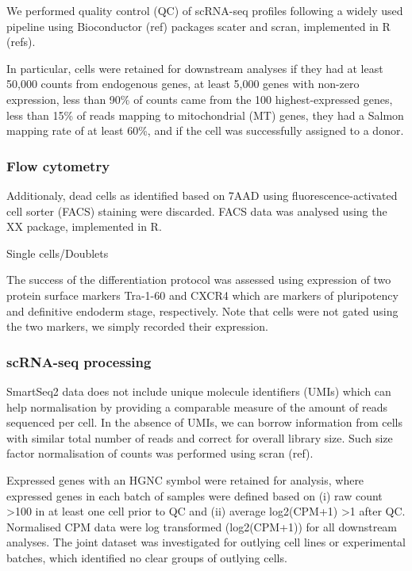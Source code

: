 We performed quality control (QC) of scRNA-seq profiles following a widely used pipeline using Bioconductor (ref) packages scater \cite{mccarthy2017scater} and scran, implemented in R (refs).  

In particular, cells were retained for downstream analyses if they had at least 50,000 counts from endogenous genes, at least 5,000 genes with non-zero expression, less than 90\% of counts came from the 100 highest-expressed genes, less than 15\% of reads mapping to mitochondrial (MT) genes, they had a Salmon mapping rate of at least 60\%, and if the cell was successfully assigned to a donor. 

\subsubsection{Flow cytometry}

Additionaly, dead cells as identified based on 7AAD using fluorescence-activated cell sorter (FACS) staining were discarded. FACS data was analysed using the XX package, implemented in R. 

Single cells/Doublets

The success of the differentiation protocol was assessed using expression of two protein surface markers Tra-1-60 and CXCR4 which are markers of pluripotency and definitive endoderm stage, respectively. Note that cells were not gated using the two markers, we simply recorded their expression.

\subsubsection{scRNA-seq processing}

SmartSeq2 data does not include unique molecule identifiers (UMIs) which can help normalisation by providing a comparable measure of the amount of reads sequenced per cell. 
In the absence of UMIs, we can borrow information from cells with similar total number of reads and correct for overall library size. 
Such size factor normalisation of counts was performed using scran (ref). 

Expressed genes with an HGNC symbol were retained for analysis, where expressed genes in each batch of samples were defined based on (i) raw count >100 in at least one cell prior to QC and (ii) average log2(CPM+1) >1 after QC. 
Normalised CPM data were log transformed (log2(CPM+1)) for all downstream analyses. 
The joint dataset was investigated for outlying cell lines or experimental batches, which identified no clear groups of outlying cells. 

